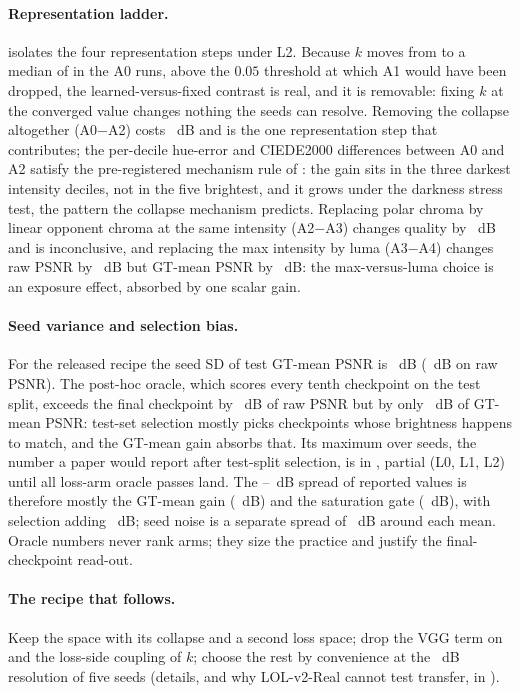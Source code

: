 \paragraph{Representation ladder.}  isolates the four representation steps
under L2. Because $k$ moves from  to a median of  in the A0 runs,
above the $0.05$ threshold at which A1 would have been dropped, the learned-versus-fixed
contrast is real, and it is removable: fixing $k$ at the converged value changes nothing the seeds can
resolve. Removing the
collapse altogether (A0$-$A2) costs ~dB and is the one representation step that
contributes; the per-decile hue-error and CIEDE2000 differences between A0 and A2 satisfy the
pre-registered mechanism rule of : the gain sits in the three darkest
intensity deciles, not in the five brightest, and it grows under the darkness stress test,
the pattern the collapse mechanism predicts. Replacing polar chroma by linear
opponent chroma at the same intensity (A2$-$A3) changes quality by ~dB and is
inconclusive, and replacing the max intensity by luma (A3$-$A4) changes raw PSNR by
~dB but GT-mean PSNR by ~dB: the max-versus-luma choice is an exposure
effect, absorbed by one scalar gain.

\paragraph{Seed variance and selection bias.}
\label{sec:selection}
For the released recipe the seed SD of test GT-mean PSNR is ~dB (~dB on
raw PSNR). The post-hoc oracle, which
scores every tenth checkpoint on the test split, exceeds the final checkpoint by
~dB of raw PSNR but by only ~dB of GT-mean PSNR: test-set selection
mostly picks checkpoints whose brightness happens to match, and the GT-mean gain absorbs
that. Its maximum over seeds, the number a paper would report after test-split selection,
is in , partial (L0, L1, L2) until all loss-arm oracle passes land. The --~dB spread of reported \dataset values
\citep{yan2025hvi, hvicidnet_issue66} is therefore mostly the GT-mean gain (~dB) and the saturation gate
(~dB), with selection adding ~dB; seed noise is a separate spread of
~dB around each mean. Oracle numbers never rank arms; they size the practice and justify the final-checkpoint
read-out.



\paragraph{The recipe that follows.} Keep the \hvi space with its collapse and a second
loss space; drop the VGG term on \hvi and the loss-side coupling of $k$; choose the rest by
convenience at the ~dB resolution of five seeds (details, and why LOL-v2-Real cannot test transfer, in
).
